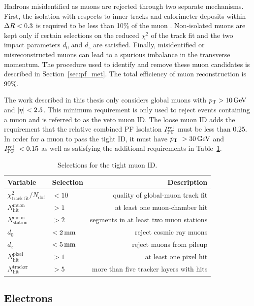 Hadrons misidentified as muons are rejected through two separate mechanisms. First, the isolation with respects to inner tracks and calorimeter deposits within $\Delta R < 0.3$ is required to be less than 10\% of the muon \pt.
Non-isolated muons are kept only if certain selections on the reduced $\chi^2$ of the track fit and the two impact parameters $d_0$ and $d_z$ are satisfied.
Finally, misidentified or misreconstructed muons can lead to a spurious imbalance in the transverse momentum.
The procedure used to identify and remove these muon candidates is described in Section~\ref{sec:pf_met}.
The total efficiency of muon reconstruction is 99\%.

The work described in this thesis only considers global muons with $p_{\mathrm{T}} > 10\,\text{Ge\hspace{-.08em}V}$ and $\lvert \eta \rvert < 2.5$.
This minimum requirement is only used to reject events containing a muon and is referred to as the veto muon ID. 
The loose muon ID adds the requirement that the relative combined PF Isolation $I_{\text{PF}}^{\text{rel}}$ must be less than 0.25.
In order for a muon to pass the tight ID, it must have $p_{\mathrm{T}}\ > 30\,\text{Ge\hspace{-.08em}V}$ and $I_{\text{PF}}^{\text{rel}}\ < 0.15$ as well as satisfying the additional requirements in Table~\ref{tab:muid}.

\begin{table}[htbp]
  \begin{center}
    \begin{tabular}{l | l | r}
      Variable & Selection & Description \\
      \hline
      $\chi^2_{\text{track fit}}/ N_{\text{dof}}$ & $ < 10$ & quality of global-muon track fit \\ 
      $N_{\text{hit}}^{\text{muon}}$ & $ > 1$ & at least one muon-chamber hit\\
      $N_{\text{station}}^{\text{muon}}$ & $ > 2$ & segments in at least two muon stations \\
      $d_0$ & $ < 2\,\text{mm}$ & reject cosmic ray muons \\
      $d_z$ & $ < 5\,\text{mm}$ & reject muons from pileup \\
      $N_{\text{hit}}^{\text{pixel}}$ & $ > 1$ & at least one pixel hit \\
      $N_{\text{hit}}^{\text{tracker}}$ & $ > 5$ & more than five tracker layers with hits 
    \end{tabular}
    \caption{Selections for the tight muon ID.}
    \label{tab:muid}
  \end{center}
\end{table}

\subsection{Electrons}
\label{sec:pf_electrons}

